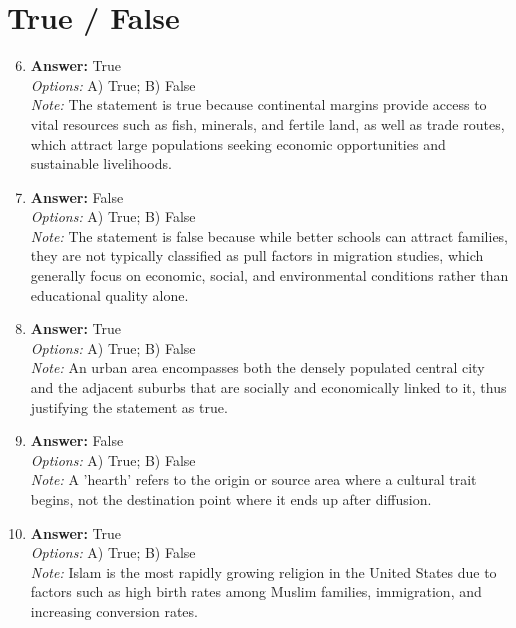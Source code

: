 \documentclass[12pt]{article}
\begin{document}
\section*{True / False}
\begin{enumerate}[label=\arabic*.]
\setcounter{enumi}{5}
\item \textbf{Answer:} True
\\ \textit{Options:} A) True; B) False
\\ \textit{Note:} The statement is true because continental margins provide access to vital resources such as fish, minerals, and fertile land, as well as trade routes, which attract large populations seeking economic opportunities and sustainable livelihoods.
\item \textbf{Answer:} False
\\ \textit{Options:} A) True; B) False
\\ \textit{Note:} The statement is false because while better schools can attract families, they are not typically classified as pull factors in migration studies, which generally focus on economic, social, and environmental conditions rather than educational quality alone.
\item \textbf{Answer:} True
\\ \textit{Options:} A) True; B) False
\\ \textit{Note:} An urban area encompasses both the densely populated central city and the adjacent suburbs that are socially and economically linked to it, thus justifying the statement as true.
\item \textbf{Answer:} False
\\ \textit{Options:} A) True; B) False
\\ \textit{Note:} A 'hearth' refers to the origin or source area where a cultural trait begins, not the destination point where it ends up after diffusion.
\item \textbf{Answer:} True
\\ \textit{Options:} A) True; B) False
\\ \textit{Note:} Islam is the most rapidly growing religion in the United States due to factors such as high birth rates among Muslim families, immigration, and increasing conversion rates.
\end{enumerate}
\end{document}
